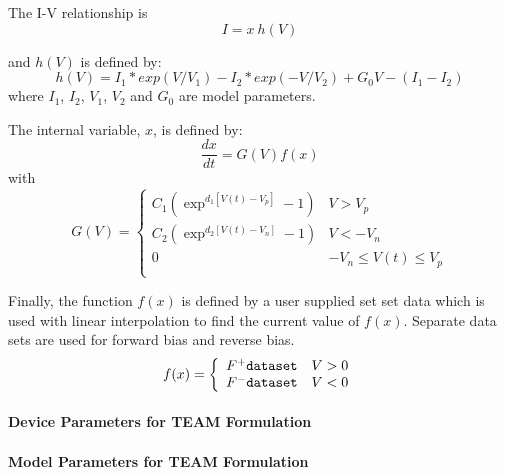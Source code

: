 The I-V relationship is
\begin{equation}
I = x \: h(V)
\end{equation}

and $h(V)$ is defined by:
\begin{equation}
 h(V) = I_1 * exp(V/V_1) - I_2 * exp(-V/V_2) + G_0 V - (I_1-I_2)
\end{equation}
where $I_1$, $I_2$, $V_1$, $V_2$ and $G_0$ are model parameters.

The internal variable, $x$, is defined by:
\begin{equation}
  \frac{dx}{dt} = G(V) f(x)
\end{equation}
with
\begin{equation}
G(V) = \left\{  
  \begin{array}{ll}
   C_1 \left( \exp^{d_1\left[ V(t) - V_p\right]} - 1\right) & V > V_p \\
   C_2 \left( \exp^{d_2\left[ V(t) - V_n\right]} - 1\right) & V < -V_n \\
   0 & -V_n \le V(t) \le V_p \\
  \end{array}
  \right.
\end{equation}

Finally, the function $f(x)$ is defined by a user supplied set set data which is 
used with linear interpolation to find the current value of $f(x)$.  Separate data
sets are used for forward bias and reverse bias.
\begin{equation}
f(x) = \left\{  
  \begin{array}{ll}
   F^+ {\tt data set} & V > 0 \\
   F^- {\tt data set} & V < 0 \\
  \end{array}
  \right.
\end{equation}





\paragraph{Device Parameters for TEAM Formulation}


\paragraph{Model Parameters for TEAM Formulation}



